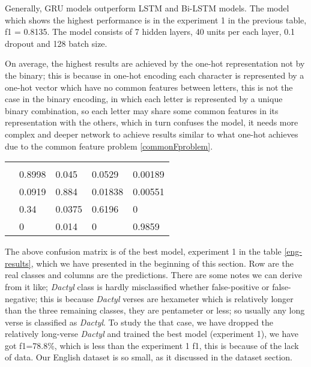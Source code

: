 
Generally, GRU models outperform LSTM and Bi-LSTM models.  The model which shows
the highest performance is in the experiment 1 in the previous table, f1 =
0.8135. The model consists of 7 hidden layers, 40 units per each layer, 0.1
dropout and 128 batch size. 

On average, the highest results are achieved by the one-hot representation not by
the binary; this is because in one-hot encoding each character is represented by
a one-hot vector which have no common features between letters, this is not the case in
the binary encoding, in which each letter is represented by a unique binary
combination, so each letter may share some common features in its representation
with the others, which in turn confuses the model, it needs more complex and
deeper network to achieve results similar to what one-hot achieves due to the
common feature problem
\ref{commonFproblem}.



\begin{center}
    \small
    \begin{tabular}{ *{5}{E}}
        \woB{} &    &  &  & \\
             & 0.8998 & 0.045  & 0.0529  & 0.00189 \\
         & 0.0919 & 0.884  & 0.01838 & 0.00551 \\
         	 & 0.34   & 0.0375 & 0.6196  & 0       \\
            & 0      & 0.014  & 0       & 0.9859  \\
    \end{tabular}
\end{center}
The above confusion matrix is of the best model, experiment 1 in the table
\ref{eng-results}, which we have presented in
the beginning of this section. Row are the real classes and columns are the
predictions.  There are some notes we can derive from it like; \textit{Dactyl}
class is hardly misclassified whether false-positive or false-negative; this
is because \textit{Dactyl} verses are hexameter which is relatively longer than
the three remaining classes, they are pentameter or less; so usually any long
verse is classified as \textit{Dactyl}. To study the that case, we have dropped
the relatively long-verse \textit{Dactyl} and trained the best model (experiment
1), we have got f1=78.8\%, which is less than the experiment 1 f1, this is
because of the lack of data. Our English dataset is so small, as it discussed in
the dataset section.



